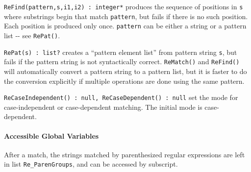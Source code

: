 \texttt{ReFind(pattern,s,i1,i2) : integer*} produces the sequence of
positions in \texttt{s} where substrings begin that match
\texttt{pattern}, but fails if there is no such position.
Each position is produced only once. %
\texttt{pattern} can be
either a string or a pattern list -{}- see \texttt{RePat()}.

\texttt{RePat(s) : list?} creates a ``pattern element list'' from pattern
string \texttt{s}, but fails if the pattern string is not syntactically
correct. \texttt{ReMatch()} and \texttt{ReFind()} will automatically
convert a pattern string to a pattern list, but it is faster to do the
conversion explicitly if multiple operations are done using the same
pattern. %

\texttt{ReCaseIndependent() : null, ReCaseDependent() : null} set the
mode for case-independent or case-dependent matching. The initial mode
is case-dependent.

\paragraph{Accessible Global Variables}
After a match, the strings matched by parenthesized regular expressions
are left in list \texttt{Re\_ParenGroups}, and can be accessed by
subscript.




